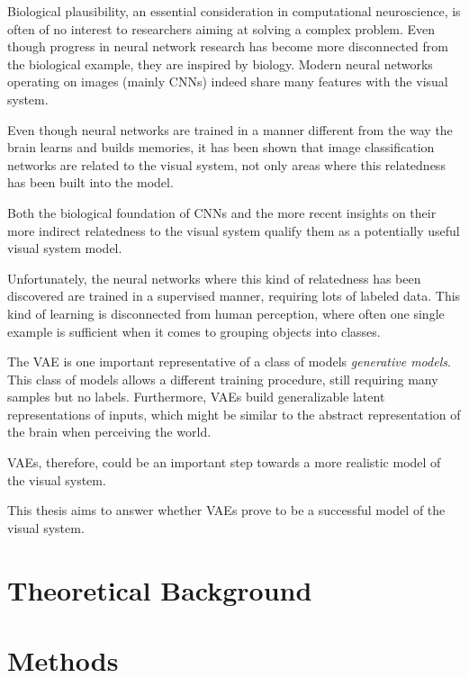 \documentclass[11pt,a4paper]{article}
\let\oldsection\section
\renewcommand\section{\clearpage\oldsection}
\begin{document}
Biological plausibility, an essential consideration in computational neuroscience, is often of no interest to researchers aiming at solving a complex problem.
Even though progress in neural network research has become more disconnected from the biological example, they are inspired by biology.
Modern neural networks operating on images (mainly \acp{CNN}) indeed share many features with the visual system.

Even though neural networks are trained in a manner different from the way the brain learns and builds memories, it has been shown that image classification networks are related to the visual system, not only areas where this relatedness has been built into the model.

Both the biological foundation of \acp{CNN} and the more recent insights on their more indirect relatedness to the visual system qualify them as a potentially useful visual system model.

Unfortunately, the neural networks where this kind of relatedness has been discovered are trained in a supervised manner, requiring lots of labeled data.
This kind of learning is disconnected from human perception, where often one single example is sufficient when it comes to grouping objects into classes.

The \ac{VAE} is one important representative of a class of models \textit{generative models}.
This class of models allows a different training procedure, still requiring many samples but no labels.
Furthermore, \acp{VAE} build generalizable latent representations of inputs, which might be similar to the abstract representation of the brain when perceiving the world.

\acp{VAE}, therefore, could be an important step towards a more realistic model of the visual system.

This thesis aims to answer whether \acp{VAE} prove to be a successful model of the visual system.

\acresetall
\section{Theoretical Background}\label{sec:theoretical-background}


\acresetall
\section{Methods}\label{sec:methods}


\acresetall
\end{document}
